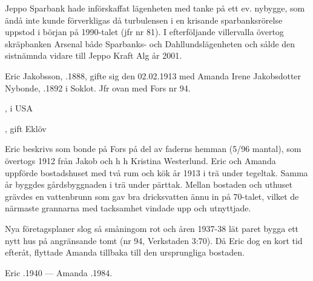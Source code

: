 Jeppo Sparbank hade införskaffat lägenheten med tanke på ett ev. nybygge, som ändå inte kunde förverkligas då turbulensen i en krisande sparbanksrörelse uppstod i början på 1990-talet (jfr nr 81). I efterföljande villervalla övertog skräpbanken Arsenal både Sparbanks- och Dahllundslägenheten och sålde den sistnämnda vidare till Jeppo Kraft Alg år 2001.


\jhvspace{}


Eric Jakobsson, .1888, gifte sig den 02.02.1913 med Amanda Irene Jakobsdotter Nybonde, .1892 i Soklot. Jfr ovan med Fors nr 94.
\begin{jhchildren}
  \item {}, i USA
  \item {}
  \item {}, gift Eklöv
\end{jhchildren}

Eric beskrivs som bonde på Fors på del av faderns hemman (5/96 mantal), som övertogs 1912 från Jakob och h h Kristina Westerlund. Eric och Amanda uppförde bostadshuset med två rum och kök år 1913 i trä under tegeltak. Samma år byggdes gårdsbyggnaden i trä under pärttak. Mellan bostaden och uthuset grävdes en vattenbrunn som gav bra dricksvatten ännu in på 70-talet, vilket de närmaste grannarna med tacksamhet vindade upp och utnyttjade.

Nya företagsplaner slog så småningom rot och åren 1937-38 lät paret bygga ett nytt hus på angränsande tomt (nr 94, Verkstaden 3:70). Då Eric dog en kort tid efteråt, flyttade Amanda tillbaka till den ursprungliga bostaden.

Eric .1940  ---  Amanda .1984.


